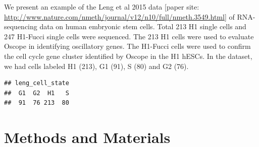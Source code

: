 \documentclass[12pt]{article}
\begin{document}
We present an example of the Leng et al 2015 data [paper site: \url{http://www.nature.com/nmeth/journal/v12/n10/full/nmeth.3549.html}] of RNA-sequencing data on human embryonic stem cells. Total 213 H1 single cells and 247 H1-Fucci single cells were sequenced. The 213 H1 cells were used to evaluate Oscope in identifying oscillatory genes. The H1-Fucci cells were used to confirm the cell cycle gene cluster identified by Oscope in the H1 hESCs. In the dataset, we had cells labeled H1 (213), G1 (91), S (80) and G2 (76).


\begin{knitrout}
\color{fgcolor}\begin{kframe}
\begin{alltt}
\hlopt{::}\hlstd{(}\hlstd{,} \hlstd{=}\hlstd{)}
\end{alltt}
\end{kframe}
\end{knitrout}

\begin{knitrout}
\color{fgcolor}\begin{kframe}
\begin{alltt}
\hlstd{(}\hlstd{)}
 \hlkwb{<-} \hlopt{::}

 \hlkwb{<-} \hlopt{::}
 \hlkwb{<-} \hlopt{::}
 \hlkwb{<-} \hlopt{$}

\end{alltt}
\begin{verbatim}
## leng_cell_state
##  G1  G2  H1   S 
##  91  76 213  80
\end{verbatim}
\end{kframe}
\end{knitrout}

\section{Methods and Materials}
\end{document}

